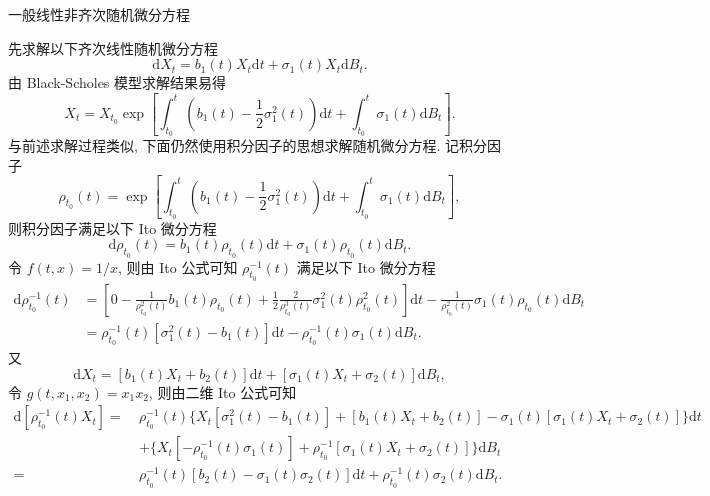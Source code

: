 \documentclass[openany]{ctexbook}
\theoremstyle{kaiti}
\theoremstyle{normal}
\begin{document}
一般线性非齐次随机微分方程

先求解以下齐次线性随机微分方程
\begin{equation}
  \mathrm{d}X_t=b_1(t) X_t\mathrm{d}t+\sigma_1(t) X_t\mathrm{d}B_t.
\end{equation}
由 Black-Scholes 模型求解结果易得
\begin{equation}
  X_t=X_{t_0}\exp\left[\int_{t_0}^t\left(b_1(t)-\frac{1}{2}\sigma_1^2(t)\right)\mathrm{d}t+\int_{t_0}^t\sigma_1(t) \mathrm{d}B_t\right].
\end{equation}
与前述求解过程类似, 下面仍然使用积分因子的思想求解随机微分方程. 记积分因子
\begin{equation}
  \rho_{t_0}(t)=\exp\left[\int_{t_0}^t\left(b_1(t)-\frac{1}{2}\sigma_1^2(t)\right)\mathrm{d}t+\int_{t_0}^t\sigma_1(t) \mathrm{d}B_t\right],
\end{equation}
则积分因子满足以下 Ito 微分方程
\begin{equation}
  \mathrm{d}\rho_{t_0}(t)=b_1(t) \rho_{t_0}(t)\mathrm{d}t+\sigma_1(t) \rho_{t_0}(t)\mathrm{d}B_t.
\end{equation}
令 $f(t,x)=1/x$, 则由 Ito 公式可知 $\rho_{t_0}^{-1}(t)$ 满足以下 Ito 微分方程
\begin{equation}
  \begin{aligned}
    \mathrm{d}\rho_{t_0}^{-1}(t)
    &=\left[0-\frac{1}{\rho_{t_0}^2(t)}b_1(t) \rho_{t_0}(t)+\frac{1}{2}\frac{2}{\rho_{t_0}^3(t)}\sigma_1^2(t) \rho_{t_0}^2(t)\right]\mathrm{d}t-\frac{1}{\rho_{t_0}^2(t)}\sigma_1(t) \rho_{t_0}(t)\mathrm{d}B_t\\
    &=\rho_{t_0}^{-1}(t)[\sigma_1^2(t)-b_1(t)]\mathrm{d}t-\rho_{t_0}^{-1}(t)\sigma_1(t)\mathrm{d}B_t.
  \end{aligned}
\end{equation}
又
\begin{equation}
  \mathrm{d}X_t=[b_1(t) X_t+b_2(t)]\mathrm{d}t+[\sigma_1(t) X_t+\sigma_2(t)]\mathrm{d}B_t,
\end{equation}
令 $g(t,x_1,x_2)=x_1x_2$, 则由二维 Ito 公式可知
\begin{equation}
  \begin{aligned}
    \mathrm{d}[\rho_{t_0}^{-1}(t)X_t]
    =~&\rho_{t_0}^{-1}(t)\Big\{X_t[\sigma_1^2(t)-b_1(t)]+[b_1(t) X_t+b_2(t)]-\sigma_1(t)[\sigma_1(t) X_t+\sigma_2(t)]\Big\}\mathrm{d}t\\
    &+\Big\{X_t[-\rho_{t_0}^{-1}(t)\sigma_1(t)]+\rho_{t_0}^{-1}[\sigma_1(t) X_t+\sigma_2(t)]\Big\}\mathrm{d}B_t\\
    =~&\rho_{t_0}^{-1}(t)[b_2(t)-\sigma_1(t)\sigma_2(t)]\mathrm{d}t+\rho_{t_0}^{-1}(t)\sigma_2(t)\mathrm{d}B_t.\\
  \end{aligned}
\end{equation}
\end{document}
